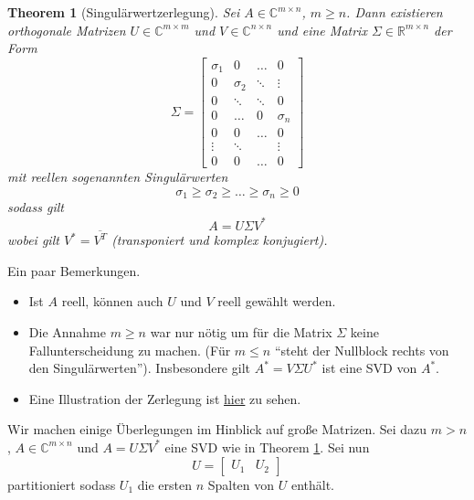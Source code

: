 \documentclass[]{book}
\providecommand{\tightlist}{%
  \setlength{\itemsep}{0pt}\setlength{\parskip}{0pt}}
\newtheorem{theorem}{Theorem}[chapter]
\theoremstyle{definition}
\theoremstyle{definition}
\theoremstyle{definition}
\theoremstyle{definition}
\theoremstyle{remark}
\begin{document}
\begin{theorem}[Singulärwertzerlegung]
\protect\hypertarget{thm:SVD}{}\label{thm:SVD}Sei \(A\in \mathbb C^{m\times n}\), \(m\geq n\). Dann existieren orthogonale Matrizen \(U \in \mathbb C^{m\times m}\) und \(V\in \mathbb C^{n\times n}\) und eine Matrix \(\Sigma \in \mathbb R^{m\times n}\) der Form
\begin{equation*}
\Sigma = 
\begin{bmatrix}
\sigma_1 & 0 & \dots & 0\\
0 & \sigma_2 &\ddots & \vdots\\
0 & \ddots & \ddots &0\\
  0 & \dots&0 & \sigma_n \\
  0 & 0 & \dots & 0 \\
  \vdots & \ddots &  & \vdots\\
  0 & 0 & \dots & 0
\end{bmatrix}
\end{equation*}
mit reellen sogenannten \emph{Singulärwerten}
\begin{equation*}
\sigma_1 \geq \sigma_2 \geq \dots \geq \sigma_n \geq 0
\end{equation*}
sodass gilt
\begin{equation*}
A = U \Sigma V^*
\end{equation*}
wobei gilt \(V^* = \overline{V^T}\) (transponiert und komplex konjugiert).
\end{theorem}

Ein paar Bemerkungen.

\begin{itemize}
\tightlist
\item
  Ist \(A\) reell, können auch \(U\) und \(V\) reell gewählt werden.
\item
  Die Annahme \(m \geq n\) war nur nötig um für die Matrix \(\Sigma\) keine Fallunterscheidung zu machen. (Für \(m\leq n\) ``steht der Nullblock rechts von den Singulärwerten''). Insbesondere gilt \(A^* = V\Sigma U^*\) ist eine SVD von \(A^*\).
\item
  Eine Illustration der Zerlegung ist \href{@fig-SVD}{hier} zu sehen.
\end{itemize}

Wir machen einige Überlegungen im Hinblick auf große Matrizen. Sei dazu \(m>n\), \(A\in \mathbb C^{m\times n}\) und \(A=U\Sigma V^*\) eine SVD wie in Theorem \ref{thm:SVD}. Sei nun
\begin{equation*}
U = \begin{bmatrix}
U_1 & U_2
\end{bmatrix}
\end{equation*}
partitioniert sodass \(U_1\) die ersten \(n\) Spalten von \(U\) enthält.
\end{document}
